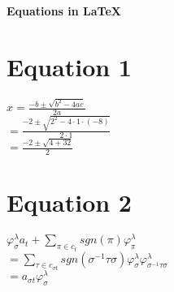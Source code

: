 \documentclass{article}
\begin{document}
	\begin{center}
		\large{\textbf{Equations in LaTeX}}
	\end{center}
	
	\section*{Equation 1}
	$x = \frac{-b \pm \sqrt{b^2 - 4ac}}{2a}$\\
	
	$= \frac{-2 \pm \sqrt{2^2 - 4 \cdot 1 \cdot (-8)}}{2 \cdot 1}$\\
	
	$= \frac{-2 \pm \sqrt{4 + 32}}{2}$\\
	
	\section*{Equation 2}
	$\varphi^{\lambda}_{\sigma}a_{t} + \sum_{\pi \in c_{t}} 
	sgn(\pi)\varphi^{\lambda}_{\pi}$\\
	
	$= \sum_{\tau \in c_{\sigma t}} sgn(\sigma^{-1} \tau \sigma) 
	\varphi^{\lambda}_{\sigma} \varphi^{\lambda}_{\sigma^{-1} \tau \sigma}$\\
	
	$= a_{\sigma t} \varphi^{\lambda}_{\sigma}$\\
	
\end{document}
